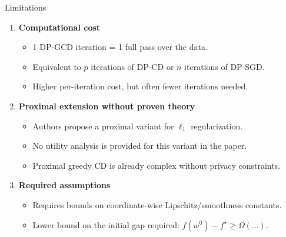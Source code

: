 \documentclass[10pt]{beamer}
\begin{document}
\begin{frame}{Limitations}
\begin{enumerate}
\item \textbf{Computational cost}
\begin{itemize}
\item 1 DP-GCD iteration = 1 full pass over the data.
\item Equivalent to $p$ iterations of DP-CD or $n$ iterations of DP-SGD.
\item Higher per-iteration cost, but often fewer iterations needed.
\end{itemize}

\item \textbf{Proximal extension without proven theory}
\begin{itemize}
\item Authors propose a proximal variant for $\ell_1$ regularization.
\item \alert{No utility analysis is provided for this variant} in the paper.
\item Proximal greedy CD is already complex without privacy constraints.
\end{itemize}

\item \textbf{Required assumptions}
\begin{itemize}
\item Requires bounds on coordinate-wise Lipschitz/smoothness constants.
\item Lower bound on the initial gap required: $f(w^0) - f^\star \geq \Omega(\dots)$.
\end{itemize}

\end{enumerate}
\end{frame}
\end{document}
